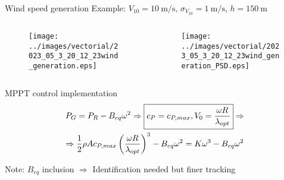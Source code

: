 \begin{frame}{Wind speed generation}
  {\scriptsize
  Example: $V_{10}=10 \ \si{\meter\per\second}$, $\sigma_{V_{10}}=1 \ \si{\meter\per\second}$, $h=150 \ \si{\meter}$
  }
    \begin{columns}
      \begin{column}{0.5\columnwidth}
        \begin{figure}[htb]
          \centering
          \texttt{[image: ../images/vectorial/2023\_05\_3\_20\_12\_23wind\_generation.eps]}
          \label{fig:wind_generation}
      \end{figure}
    \end{column}
  
    \begin{column}{0.5\columnwidth}
      \begin{figure}[htb]
          \centering
          \texttt{[image: ../images/vectorial/2023\_05\_3\_20\_12\_23wind\_generation\_PSD.eps]}
          \label{fig:wind_generation_PSD}
      \end{figure}
    \end{column}
  \end{columns}
\end{frame}

\begin{frame}{MPPT control implementation}
  \begin{gather}
    P_G = P_R - B_{eq} \omega^2 \Rightarrow \boxed{c_P = c_{P,max}, V_0=\frac{\omega R}{\lambda_{opt}}} \Rightarrow \notag\\
    \Rightarrow \frac{1}{2}\rho A c_{P,max} \left(\frac{\omega R}{\lambda_{opt}}\right)^3 - B_{eq} \omega^2=K\omega^3 - B_{eq} \omega^2
    \notag
  \end{gather}

  \begin{figure}
      \centering
  \end{figure}
  Note: $B_{eq}$ inclusion $\Rightarrow$ Identification needed but finer tracking
\end{frame}

